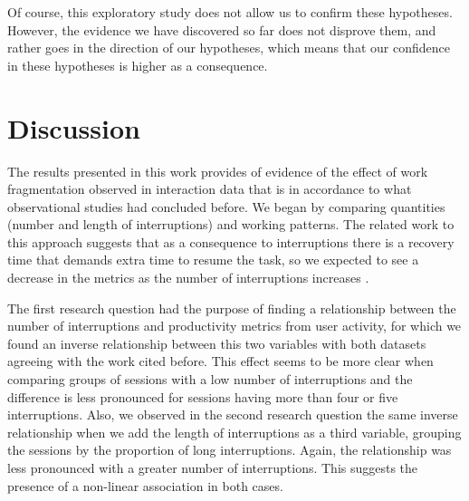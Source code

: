 \documentclass[times]{smrauth}
\begin{document}
Of course, this exploratory study does not allow us to confirm these hypotheses. However, the evidence we have discovered so far does not disprove them, and rather goes in the direction of our hypotheses, which means that our confidence in these hypotheses is higher as a consequence.



\section{Discussion}

The results presented in this work provides of evidence of the effect of work fragmentation observed in interaction data that is in accordance to what observational studies had concluded before. We began by comparing quantities (number and length of interruptions) and working patterns. The related work to this approach suggests that as a consequence to interruptions there is a recovery time that demands extra time to resume the task, so we expected to see a decrease in the metrics as the number of interruptions increases \cite{MGH05,IH07,CHW04}.

The first research question had the purpose of finding a relationship between the number of interruptions and productivity metrics from user activity, for which we found an inverse relationship between this two variables with both datasets agreeing with the work cited before. This effect seems to be more clear when comparing groups of sessions with a low number of interruptions and the difference is less pronounced for sessions having more than four or five interruptions. Also, we observed in the second research question the same inverse relationship when we add the length of interruptions as a third variable, grouping the sessions by the proportion of long interruptions. Again, the relationship was less pronounced with a greater number of interruptions. This suggests the presence of a non-linear association in both cases.
\end{document}
